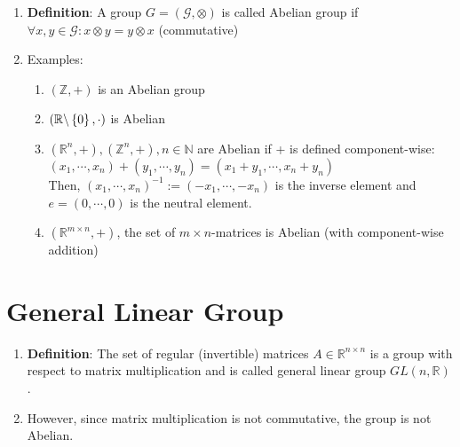 \begin{enumerate}
    \item \textbf{Definition}: A group $G = (\mathcal{G}, \otimes)$ is called Abelian group if $\forall x, y \in \mathcal{G} : x \otimes y = y \otimes x$ (commutative)
    \hfill \cite{mfml/book/mml/Deisenroth-Faisal-Ong}

    \item Examples:
    \begin{enumerate}
        \item $(\mathbb{Z}, +)$ is an Abelian group
        \hfill \cite{mfml/book/mml/Deisenroth-Faisal-Ong}

        \item $( \mathbb{R} \backslash \left\{0\right\}, \cdot)$ is Abelian
        \hfill \cite{mfml/book/mml/Deisenroth-Faisal-Ong}

        \item $(\mathbb{R}^n, +),(\mathbb{Z}^n, +), n \in \mathbb{N}$ are Abelian if + is defined component-wise:
        \\
        $
            (x_1, \cdots , x_n) + (y_1, \cdots , y_n) = (x_1 + y_1, \cdots , x_n + y_n)
        $
        \\
        Then, $(x_1, \cdots , x_n)^{-1} := (-x_1, \cdots , -x_n)$ is the inverse element and $e = (0, \cdots , 0)$ is the neutral element.

        \item $(\mathbb{R}^{m\times n} , +)$, the set of $m \times n$-matrices is Abelian  (with component-wise addition)

        
    \end{enumerate}
\end{enumerate}





\section{General Linear Group}

\begin{enumerate}
    \item \textbf{Definition}: The set of regular (invertible) matrices $A \in \mathbb{R}^{n\times n}$ is a group with respect to matrix multiplication and is called general linear group $GL(n, \mathbb{R})$. 
    
    \item However, since matrix multiplication is not commutative, the group is not Abelian.

    
\end{enumerate}

